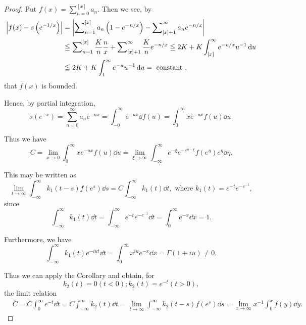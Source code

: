\begin{proof}
 Put $f(x) = \sum\limits_{n=0}^{[x]} a_n$. Then we see, by 
\begin{align}
\left| f (x) - s \left(e ^{-1/x}\right) \right|& = \left| \sum\nolimits_{n=1} ^{[x]} a _{n} \left(1 - e ^{-n/x}\right) - \sum\nolimits_{[x]+1} ^{\infty} a _{n} e ^{-n/x} \right| \notag \\
&\leqq \sum\nolimits_{n=1} ^{[x]} \frac {K}{n} \frac {n}{x} + \sum\nolimits_{[x]+1} ^{\infty} \frac {K}{n} e ^{-n/x} \leqq 2 K + K \int_{[x]} ^{\infty} e ^{-u/x} u ^{-1} \mathop{}\!\mathrm{d} u \notag \\
&\leqq 2 K + K \int_{1} ^{\infty} e ^{-u} u ^{-1} \mathop{}\!\mathrm{d} u = \text{ constant }, \notag
\end{align}
that $f(x)$ is bounded. 

Hence, by partial integration, 
\[
s \left(e ^{-x}\right) = \sum\limits_{n=0} ^{\infty} a _{n} e ^{-nx} = \int_{-0} ^{\infty} e ^{-ux} \dd f (u) = \int_{0} ^{\infty} x e ^{-ux} f (u) \dd u.
\]

Thus we have 
\begin{equation}\tag{31'}\label{eq:XI.16.31'}
C = \lim\limits _{x \rightarrow 0} \int_{0} ^{\infty} x e ^{-ux} f (u) \dd u = \lim\limits _{\xi \rightarrow \infty} \int_{- \infty} ^{\infty} e ^{- \xi} e ^ {- e ^{\eta - \xi}} f (e ^{\eta}) e ^{\eta} \dd \eta .
\end{equation}

This may be written as 
\begin{equation}\label{eq:XI.16.32}
\lim\limits _{t \rightarrow \infty} \int_{- \infty} ^{\infty} k _{1} (t - s) f \left(e ^{s}\right) \dd s = C \int_{- \infty} ^{\infty} k _{1} (t) \dd t, \text{ where } k _{1} (t) = e ^{-t} e ^ {- e ^{-t}},
\end{equation}
since 
\[
\int_{- \infty} ^{\infty} k _{1} (t) \dd t = \int_{- \infty} ^{\infty} e ^{-t} e ^ {- e ^{-t}} \dd t = \int_{0} ^{\infty} e ^{-x} \dd x = 1.
\]

Furthermore, we have 
\[
\int_{- \infty} ^{\infty} k _{1} (t) e ^{-iut} \dd t = \int_{0} ^{\infty} x ^{iu} e ^{-x} \dd x = \Gamma (1 + i u) \neq 0.
\]

Thus we can apply the Corollary and obtain, for 
\[
k _{2} (t) = 0 (t < 0); k _{2} (t) = e ^{-t} (t > 0),
\]
the limit relation 
\[
\begin{aligned}
&C= C \int_{0} ^{\infty} e ^{-t} \dd t = C \int_{- \infty} ^{\infty} k _{2} (t) \dd t = \lim\limits _{t \rightarrow \infty} \int_{- \infty} ^{\infty} k _{2} (t - s) f (e ^{s}) \dd s = \lim\limits _{x \rightarrow \infty} x ^{-1} \int_{0} ^{x} f (y) \dd y.
\end{aligned}
\]


\end{proof}
